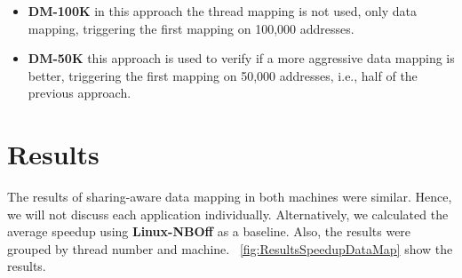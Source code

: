 \begin{itemize}
	\item \textbf{DM-100K} in this approach the thread mapping is not used, only data mapping, triggering the first mapping on 100,000 addresses. 
	
	\item \textbf{DM-50K} this approach is used to verify if a more aggressive data mapping is better, triggering the first mapping on 50,000 addresses, i.e., half of the previous approach.
\end{itemize}


\section{Results}\label{sect:resultsDataMapping}

The results of sharing-aware data mapping in both machines were similar. Hence, we will not discuss each application individually. Alternatively, we calculated the average speedup %
using \textbf{Linux-NBOff} as a baseline. Also, the results were grouped by thread number and machine. \figurename~\ref{fig:ResultsSpeedupDataMap} show the results.

